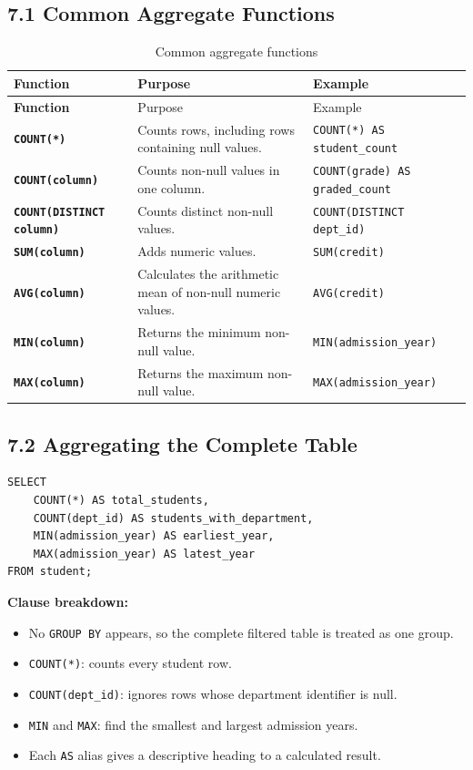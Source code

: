 \documentclass[12pt,a4paper]{article}
\begin{document}
\subsection*{7.1 Common Aggregate Functions}
\begingroup
{}
\small
\renewcommand{\arraystretch}{1.25}
\begin{longtable}{>{\bfseries}p{2.9cm} p{4.3cm} p{5.3cm}}
\caption{Common aggregate functions}
\label{tab:aggregate_functions}\\
\toprule
Function & Purpose & Example \\
\midrule
\endfirsthead
\toprule
Function & Purpose & Example \\
\midrule
\endhead
\bottomrule
\endfoot
\texttt{COUNT(*)} & Counts rows, including rows containing null values. &
\texttt{COUNT(*) AS student\_count} \\
\texttt{COUNT(column)} & Counts non-null values in one column. &
\texttt{COUNT(grade) AS graded\_count} \\
\texttt{COUNT(DISTINCT column)} & Counts distinct non-null values. &
\texttt{COUNT(DISTINCT dept\_id)} \\
\texttt{SUM(column)} & Adds numeric values. &
\texttt{SUM(credit)} \\
\texttt{AVG(column)} & Calculates the arithmetic mean of non-null numeric values. &
\texttt{AVG(credit)} \\
\texttt{MIN(column)} & Returns the minimum non-null value. &
\texttt{MIN(admission\_year)} \\
\texttt{MAX(column)} & Returns the maximum non-null value. &
\texttt{MAX(admission\_year)} \\
\end{longtable}
\endgroup

\subsection*{7.2 Aggregating the Complete Table}
\begin{verbatim}
SELECT
    COUNT(*) AS total_students,
    COUNT(dept_id) AS students_with_department,
    MIN(admission_year) AS earliest_year,
    MAX(admission_year) AS latest_year
FROM student;
\end{verbatim}

\noindent\textbf{Clause breakdown:}
\begin{itemize}
    \item No \texttt{GROUP BY} appears, so the complete filtered table is treated as one group.
    \item \texttt{COUNT(*)}: counts every student row.
    \item \texttt{COUNT(dept\_id)}: ignores rows whose department identifier is null.
    \item \texttt{MIN} and \texttt{MAX}: find the smallest and largest admission years.
    \item Each \texttt{AS} alias gives a descriptive heading to a calculated result.
\end{itemize}
\end{document}

